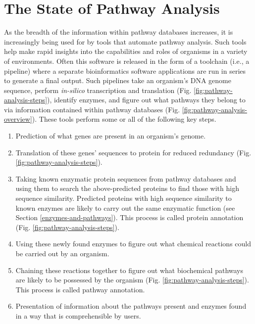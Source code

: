 \section{The State of Pathway Analysis}

As the breadth of the information within pathway databases increases, it is increasingly being used for by tools that automate pathway analysis. Such tools help make rapid insights into the capabilities and roles of organisms in a variety of environments. Often this software is released in the form of a toolchain (i.e., a pipeline) where a separate bioinformatics software applications are run in series to generate a final output. Such pipelines take an organism's DNA genome sequence, perform \textit{in-silico} transcription and translation (Fig. \ref{fig:pathway-analysis-steps}), identify enzymes, and figure out what pathways they belong to via information contained within pathway databases (Fig. \ref{fig:pathway-analysis-overview}). These tools perform some or all of the following key steps.

\begin{enumerate}
\item Prediction of what genes are present in an organism's genome.
\item Translation of these genes' sequences to protein for reduced redundancy (Fig. \ref{fig:pathway-analysis-steps}).
\item Taking known enzymatic protein sequences from pathway databases and using them to search the above-predicted proteins to find those with high sequence similarity. Predicted proteins with high sequence similarity to known enzymes are likely to carry out the same enzymatic function (see Section \ref{enzymes-and-pathways}). This process is called protein annotation (Fig. \ref{fig:pathway-analysis-steps}).
\item Using these newly found enzymes to figure out what chemical reactions could be carried out by an organism.
\item Chaining these reactions together to figure out what biochemical pathways are likely to be possessed by the organism (Fig. \ref{fig:pathway-analysis-steps}). This process is called pathway annotation.
\item Presentation of information about the pathways present and enzymes found in a way that is comprehensible by users.
\end{enumerate}

